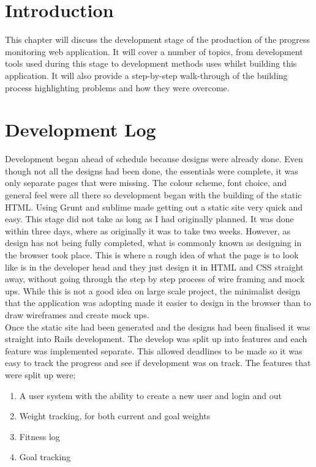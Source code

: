 \section{Introduction}
This chapter will discuss the development stage of the production of the progress monitoring web application. It will cover a number of topics, from development tools used during this stage to development methods uses whilst building this application. It will also provide a step-by-step walk-through of the building process highlighting problems and how they were overcome.\\

\section{Development Log}
Development began ahead of schedule because designs were already done. Even though not all the designs had been done, the essentials were complete, it was only separate pages that were missing. The colour scheme, font choice, and general feel were all there so development began with the building of the static HTML. Using Grunt \citep{grunt:2013} and sublime made getting out a static site very quick and easy. This stage did not take as long as I had originally planned. It was done within three days, where as originally it was to take two weeks. However, as design has not being fully completed, what is commonly known as designing in the browser took place. This is where a rough idea of what the page is to look like is in the developer head and they just design it in HTML and CSS straight away, without going through the step by step process of wire framing and mock ups. While this is not a good idea on large scale project, the minimalist design that the application was adopting made it easier to design in the browser than to draw wireframes and create mock ups.\\

Once the static site had been generated and the designs had been finalised it was straight into Rails development. The develop was split up into features and each feature was implemented separate. This allowed deadlines to be made so it was easy to track the progress and see if development was on track. The features that were split up were;

\begin{enumerate}
\item A user system with the ability to create a new user and login and out
\item Weight tracking, for both current and goal weights
\item Fitness log
\item Goal tracking
\end{enumerate}

